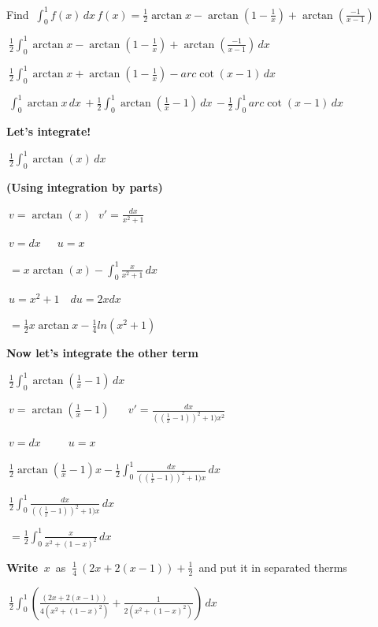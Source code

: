 \documentclass{article}
\begin{document}
\bigskip Find $\ \int_{0}^{1} f(x)\,dx \, f(x)=\frac{1}{2}\arctan{x}-\arctan{(1-\frac{1}{x})+\arctan{(\frac{-1}{x-1})}} $\

\bigskip $\ \frac{1}{2} \int_{0}^{1} \arctan{x}-\arctan{(1-\frac{1}{x})+\arctan{(\frac{-1}{x-1})}}\,dx \, \ $\

\bigskip  $\ \frac{1}{2} \int_{0}^{1} \arctan{x}+\arctan{(1-\frac{1}{x})-arc\cot{(x-1)}}\,dx \, $

\bigskip $\ \int_{0}^{1} \arctan{x}\,dx \,+\frac{1}{2}\int_{0}^{1} \arctan{(\frac{1}{x}-1)}\,dx \,- \frac{1}{2}\int_{0}^{1} arc\cot{(x-1)}\,dx \, $

\bigskip \textbf{Let's integrate!}

\bigskip $\ \frac{1}{2} \int_{0}^{1} \arctan{(x)} \,dx \, $

\bigskip \textbf{(Using integration by parts)}

\bigskip $\ v= \arctan{(x)} \,\,\,\, v'=\frac{dx}{x^2+1} $\

\bigskip $\ v=dx \,\,\,\,\,\,\,\,\, u=x $\

\bigskip $\ =x\arctan{(x)}-\int_{0}^{1} \frac{x}{x^2+1}\,dx \,$

\bigskip $\ u= x^2+1 \,\,\,\,\,\, du= 2x dx $\ 

\bigskip  $\ =\frac{1}{2}x\arctan{x}-\frac{1}{4}ln(x^2+1) $\

\bigskip
\bigskip \textbf{Now let's integrate the other term} 

\bigskip $\ \frac{1}{2} \int_{0}^{1} \arctan{(\frac{1}{x}-1)} \,dx \, $\

\bigskip $\ v= \arctan{(\frac{1}{x}-1)}  \,\,\,\,\,\,\,\,\,\, v'=\frac{dx}{((\frac{1}{x}-1))^2+1)x^2} $\

\bigskip $\ v=dx \,\,\,\,\,\,\,\,\,\,\,\,\,\,\,u=x $\

\bigskip $\ \frac{1}{2} \arctan{(\frac{1}{x}-1)}x-\frac{1}{2} \int_{0}^{1} \frac{dx}{((\frac{1}{x}-1))^2+1)x} \,dx \, $\

\bigskip $\ \frac{1}{2} \int_{0}^{1} \frac{dx}{((\frac{1}{x}-1))^2+1)x} \,dx \, $\ 


\newpage

\bigskip $\ = \frac{1}{2} \int_{0}^{1} \frac{x}{x^2+(1-x)^2} \,dx \, $\ 

\bigskip \textbf{Write} $\ x $\ {as} $\ \frac{1}{4} \ (2x+2(x-1))+ \frac{1}{2} $\ {and put it in separated therms} 

\bigskip $\ \frac{1}{2} \int_{0}^{1} (\frac{(2x+2(x-1))}{4(x^2+(1-x)^2)} + \frac{1}{2(x^2+(1-x)^2)}) \,dx \,$\ 
\end{document}
